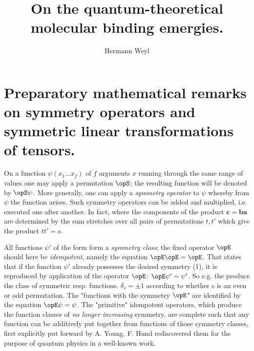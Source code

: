 \begin{paper}{1}
\begin{header}
\title{On the quantum-theoretical molecular binding emergies.}
\author{Hermann Weyl}
\makeheader
\end{header}

\newcommand{\op}[1]{\mathbf{#1}}
\nc{\opS}{\op{s}}
\nc{\opA}{\op{a}}
\nc{\opE}{\op{e}}
\newcommand{\conj}[1]{\overline{#1}}
\newcommand{\adj}[1]{\widetilde{#1}}
\newcommand{\inv}[1]{{#1}^{-1}}

\section{Preparatory mathematical remarks on symmetry operators and symmetric linear transformations of tensors.}

On a function $\psi(x_1\dots x_f)$ of $f$ arguments $x$ running through the same range of values one may apply a permutation $\opS$; the resulting function will be denoted by $\opS\psi$. More generally, one can apply a \textit{symmetry operator} to $\psi$
whereby from $\psi$ the function
arises. Such symmetry operators can be added and multiplied, i.e. executed one after another. In fact,
\uequ{
\op{b}(\op{a}\psi) = \op{c}\psi
}
where the components of the product $\op{c}=\op{b}\op{a}$ are determined by
the sum stretches over all pairs of permutations $t,t'$ which give the product $tt'=s$.

All functions $\psi'$ of the form
form a \textit{symmetry class}; the fixed operator $\opE$ should here be \textit{idempotent}, namely the equation $\opE\opE=\opE$. That states that if the function $\psi'$ already possesses the desired symmetry (1), it is reproduced by application of the operator $\opE$: $\opE\psi'=\psi'$. So e.g. the 
produce the class of symmetric resp.  functions. $\delta_s = \pm 1$ according to whether s is an even or odd permutation. The "functions with the symmetry $\opE$" are identified by the equation $\opE\psi=\psi$. The "primitive" idempotent operators, which produce the function classes of \textit{no longer increasing} symmetry, are complete such that any function can be additively put together from functions of those symmetry classes, first explicitly put forward by A. Young. F. Hund rediscovered them for the purpose of quantum physics in a well-known work.


\end{paper}
